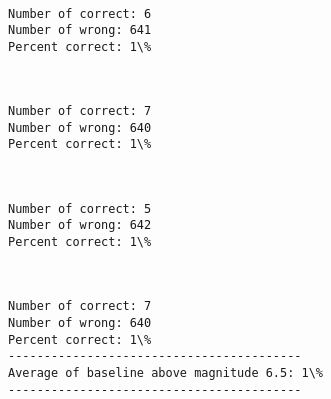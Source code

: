 \documentclass[11pt]{article}
\begin{document}
    \begin{center}
    \end{center}
    { \hspace*{\fill} \\}
    
    \begin{Verbatim}[commandchars=\\\{\}]
Number of correct: 6
Number of wrong: 641
Percent correct: 1\%

    \end{Verbatim}

    \begin{center}
    \end{center}
    { \hspace*{\fill} \\}
    
    \begin{Verbatim}[commandchars=\\\{\}]
Number of correct: 7
Number of wrong: 640
Percent correct: 1\%

    \end{Verbatim}

    \begin{center}
    \end{center}
    { \hspace*{\fill} \\}
    
    \begin{Verbatim}[commandchars=\\\{\}]
Number of correct: 5
Number of wrong: 642
Percent correct: 1\%

    \end{Verbatim}

    \begin{center}
    \end{center}
    { \hspace*{\fill} \\}
    
    \begin{Verbatim}[commandchars=\\\{\}]
Number of correct: 7
Number of wrong: 640
Percent correct: 1\%
-----------------------------------------
Average of baseline above magnitude 6.5: 1\%
-----------------------------------------

    \end{Verbatim}
\end{document}
